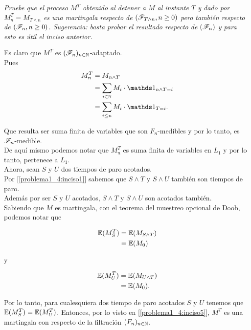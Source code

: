 \emph{
	Pruebe que el proceso $M^T$ obtenido al detener a $M$ al instante $T$ y dado por $M^T_n=M_{T\wedge n}$ es una 
	martingala respecto de $\left( \mathscr{F}_{T\wedge n},n\geq 0\right) $ pero tambi\'en respecto de $\left( \mathscr{F}_{n},n\geq 0\right) $. 
	Sugerencia: basta probar el resultado respecto de $\left( \mathscr{F}_n\right) $ y para esto es \'util el inciso anterior.
}

	Es claro que $M^T$ es $(\mathscr{F}_n)_{n \in \mathbb{N}}$-adaptado.\\

	Pues
	\begin{align}
		M_n^T 		&= 		M_{n \wedge T} 									\\
					&= 		\sum_{i \in \N} M_i \cdot \indic_{n \wedge T = i}		\\
					&=      \sum_{i \leq n} M_i \cdot \indic_{T = i}.
	\end{align}		

	Que resulta ser suma finita de variables que son $F_n$-medibles y por lo tanto,
	es $\mathscr{F}_n$-medible.	\\
	
	De aquí mismo podemos notar que $M_n^T$ es suma finita de variables en $L_1$ y por
	lo tanto, pertenece a $L_1$.\\
	
	Ahora, sean $S$ y $U$ dos tiempos de paro acotados.\\
	
	Por [\ref{problema1_4:inciso1}] sabemos que $S \wedge T$ y $S \wedge U$ también son tiempos de paro.\\
	
	Además por ser $S$ y $U$ acotados, $S \wedge T$ y $S \wedge U$ son acotados también.\\

	Sabiendo que $M$ es martingala, con el teorema del muestreo opcional de Doob, podemos notar que
	
	\begin{align}
		\mathbb{E}(M_S^T) 	&=	\mathbb{E}(M_{S \wedge T}) \\
					&= \mathbb{E}(M_0)
	\end{align}
	
	y
	
	\begin{align}
		\mathbb{E}(M_U^T) 	&=	\mathbb{E}(M_{U \wedge T}) \\
					&= \mathbb{E}(M_0).
	\end{align}
	
	Por lo tanto, para cualesquiera dos tiempo de paro acotados $S$ y $U$ tenemos que $\mathbb{E}(M_S^T) = \mathbb{E}(M_U^T)$.
	Entonces, por lo visto en [\ref{problema1_4:inciso5}], $M^T$ es una martingala con respecto de la filtración
	$(F_n)_{n \in \mathbb{N}}$.\\
	
